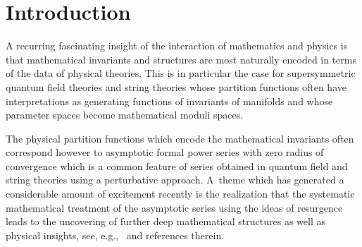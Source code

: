\documentclass[pdftex]{sigma}
\numberwithin{equation}{section}
\begin{document}


\setcounter{tocdepth}{2}
\tableofcontents

\section{Introduction}

A recurring fascinating insight of the interaction of mathematics and physics is that mathematical invariants and structures are most naturally encoded in terms of the data of physical theories. This is in particular the case for supersymmetric quantum field theories and string theo\-ries whose partition functions often have interpretations as generating functions of invariants of manifolds and whose parameter spaces become mathematical moduli spaces.

The physical partition functions which encode the mathematical invariants often correspond however to asymptotic formal power series with zero radius of convergence which is a common feature of series obtained in quantum field and string theories using a perturbative approach. A~theme which has generated a considerable amount of excitement recently is the realization that the systematic mathematical treatment of the asymptotic series using the ideas of resurgence leads to the uncovering of further deep mathematical structures as well as physical insights, see, e.g.,~\cite{Aniceto:2011nu,Marinolecture} and references therein.
\end{document}
